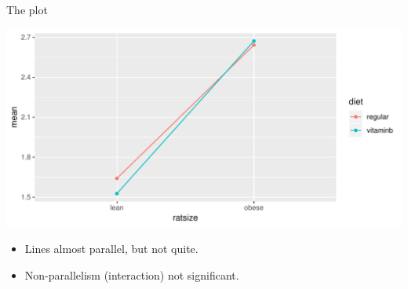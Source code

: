 \begin{frame}[fragile]{The plot}
 
  
\begin{knitrout}
\color{fgcolor}\begin{kframe}
\begin{alltt}
\end{alltt}
\end{kframe}
\includegraphics[width=\maxwidth]{figure/nachwazzo-1} 

\end{knitrout}
   
   
 
 \begin{itemize}
 \item Lines almost parallel, but not quite.
 \item Non-parallelism (interaction) not significant.
 \end{itemize}
   
\end{frame}
 

